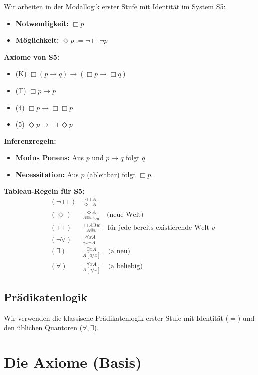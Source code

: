 \documentclass[
]{article}
\begin{document}
Wir arbeiten in der Modallogik erster Stufe mit Identität im System S5:

\begin{itemize}
\item \textbf{Notwendigkeit:} \(\Box p\)
\item \textbf{Möglichkeit:} \(\Diamond p := \neg\Box\neg p\)
\end{itemize}

\textbf{Axiome von S5:}
\begin{itemize}
\item (K) \(\Box(p \rightarrow q) \rightarrow (\Box p \rightarrow \Box q)\)
\item (T) \(\Box p \rightarrow p\)
\item (4) \(\Box p \rightarrow \Box\Box p\)
\item (5) \(\Diamond p \rightarrow \Box\Diamond p\)
\end{itemize}

\textbf{Inferenzregeln:}
\begin{itemize}
\item \textbf{Modus Ponens:} Aus \(p\) und \(p \rightarrow q\) folgt \(q\).
\item \textbf{Necessitation:} Aus \(p\) (ableitbar) folgt \(\Box p\).
\end{itemize}

\textbf{Tableau-Regeln für S5:}
\begin{align*}
& (\neg\Box) & \frac{\neg\Box A}{\Diamond\neg A} \\
& (\Diamond) & \frac{\Diamond A}{A @ w_{\text{neu}}} \quad \text{(neue Welt)} \\
& (\Box) & \frac{\Box A @ w}{A @ v} \quad \text{für jede bereits existierende Welt } v \\
& (\neg\forall) & \frac{\neg\forall x A}{\exists x \neg A} \\
& (\exists) & \frac{\exists x A}{A[a/x]} \quad \text{(a neu)} \\
& (\forall) & \frac{\forall x A}{A[a/x]} \quad \text{(a beliebig)}
\end{align*}

\subsection{Prädikatenlogik}

Wir verwenden die klassische Prädikatenlogik erster Stufe mit Identität (\(=\)) und den üblichen Quantoren (\(\forall, \exists\)).

\section{Die Axiome (Basis)}
\end{document}
